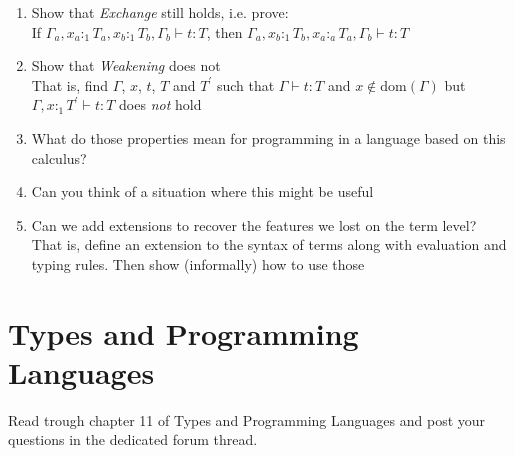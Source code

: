 \begin{enumerate}
  \item Show that \emph{Exchange} still holds, i.e. prove: \\
    If $\Gamma_a,x_a:_1 T_a, x_b :_1 T_b, \Gamma_b\vdash t:T$, then 
    $\Gamma_a, x_b:_1 T_b, x_a:_a T_a, \Gamma_b \vdash t:T$
  \item Show that \emph{Weakening} does not\\
    That is, find $\Gamma$, $x$, $t$, $T$ and $T^{\prime}$ such that 
    $\Gamma\vdash t:T$ and $x\notin\mathrm{dom}(\Gamma)$ but
    $\Gamma, x:_1 T^{\prime}\vdash t:T$ does \emph{not} hold
  \item What do those properties mean for programming in a language based on this calculus?
  \item Can you think of a situation where this might be useful
  \item Can we add extensions to recover the features we lost on the term level?\\
    That is, define an extension to the syntax of terms along with evaluation and typing rules.
    Then show (informally) how to use those
\end{enumerate}

\section{Types and Programming Languages}
Read trough chapter 11 of Types and Programming Languages and post your questions in the dedicated forum thread.
